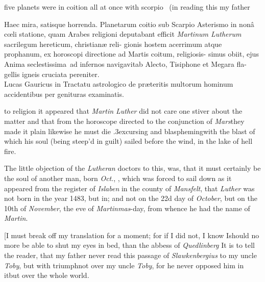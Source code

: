 \documentclass{article}
\begin{document}
five planets were in coition all at once
with scorpio \fnast\ (in reading this my father\break
{}
\vfill

\begingroup\footnotesize
\indent\fnast\enspace
Haec mira, satisque horrenda. Planetarum\break
coitio sub Scarpio Asterismo in nonâ cœli statione,\break
quam Arabes religioni deputabant efficit \textit{Martinum\break
Lutherum} sacrilegum hereticum, christianæ reli-\break
gionis hostem acerrimum atque prophanum, ex\break
horoscopi directione ad Martis coitum, religiosis-\break
simus obiit, ejus Anima seclestissima\sic\ ad infernos\break
navigavit\tsk ab Alecto, Tisiphone et Megara fla-\break 
gellis igneis cruciata pereniter.\\
\hbox{}\quad\tsk Lucas Gauricus in Tractatu astrologico de\break
præteritis multorum hominum accidentibus per\break
genituras examinatis.\par\endgroup

\newpage\noindent
{}
to religion\tsk
it appeared that \textit{Martin Lu\-ther} did not care one stiver about the matter
\tsk and that from the horoscope directed to the conjunction of \textit{Mars}\tsk they
made it plain likewise he must die\break
\lower.3ex\hbox{c}\sic ursing and
blaspheming\tsk with the blast of
which his soul (being steep’d in guilt) sailed before the wind, in the lake of
\break
hell fire.

The little objection of the \textit{Lutheran}\break
doctors to this, was, that it must certainly be the
soul of another man, born \textit{Oct}., \quad{}, which was forced to sail down  as it
appeared from the register of \textit{Islaben} in the county of
\textit{Mansfelt}, that \textit{Luther}\break
was not born in the year 1483, but in; and not on the 22d day of \textit{October}, but on the
10th of \textit{November}, the eve of \textit{Martinmas}-day, from
whence he had the name of \textit{Martin}.

[\tsh I must break off my translation for a moment; for if I
did not, I know I\break should no more be able to shut my
eyes in bed, than the abbess of \textit{Quedlinberg}\tsk\break
It is to tell the reader, that my father never read this
passage of \textit{Slawkenbergius} to my uncle
\textit{Toby}, but with triumph\tsk not over my uncle
\textit{Toby}, for he never opposed him in it\tsk but over
the whole world.
\end{document}
